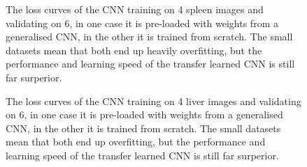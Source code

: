 \begin{figure}[h!]
\centering
{}
\caption{The loss curves of the CNN training on 4 spleen images and validating on 6, in one case it is pre-loaded with weights from a generalised CNN, in the other it is trained from scratch. The small datasets mean that both end up heavily overfitting, but the performance and learning speed of the transfer learned CNN is still far surperior.}
\label{fig:lossTransSpleen}
\end{figure}

\begin{figure}[h!]
\centering
{}
\caption{The loss curves of the CNN training on 4 liver images and validating on 6, in one case it is pre-loaded with weights from a generalised CNN, in the other it is trained from scratch. The small datasets mean that both end up overfitting, but the performance and learning speed of the transfer learned CNN is still far surperior.}
\label{fig:lossTransLiver}
\end{figure}


